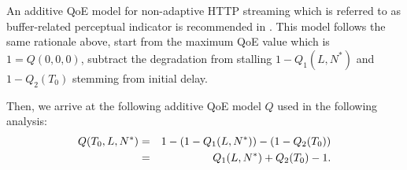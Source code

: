 An additive \gls{QoE} model for non-adaptive HTTP streaming which is referred to as buffer-related perceptual indicator is recommended in \cite{ITUT2012}. This model follows the same rationale above, start from the maximum QoE value which is \(1=Q(0,0,0)\), subtract the degradation from stalling \(1-Q_1(L,N^*)\) and \(1-Q_2(T_0)\) stemming from initial delay.

Then, we arrive at the following additive QoE model \(Q\) used in the following analysis:
\begin{eqnarray}
  Q(T_0,L,N^*) &=& 1-(1-Q_1(L,N^*)) - (1-Q_2(T_0)) \notag\\
   &=& Q_1(L,N^*) + Q_2(T_0) - 1.
\label{eq:application:qoe_user_behaviour:typical_user_scenarios:youtube_qoe:combined:qsum}
\end{eqnarray}
